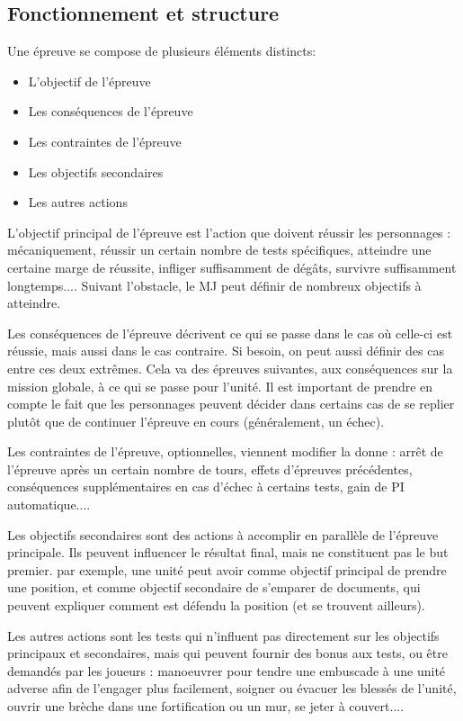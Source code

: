\documentclass[twocolumn]{report}
\begin{document}
\subsection{Fonctionnement et structure}
Une épreuve se compose de plusieurs éléments distincts:
\begin{itemize}
    \item L'objectif de l'épreuve
    \item Les conséquences de l'épreuve
    \item Les contraintes de l'épreuve
    \item Les objectifs secondaires
    \item Les autres actions
\end{itemize}
L'objectif principal de l'épreuve est l'action que doivent réussir les personnages : mécaniquement, réussir un certain nombre de tests spécifiques, atteindre une certaine marge de réussite, infliger suffisamment de dégâts, survivre suffisamment longtemps.... Suivant l'obstacle, le MJ peut définir de nombreux objectifs à atteindre.

Les conséquences de l'épreuve décrivent ce qui se passe dans le cas où celle-ci est réussie, mais aussi dans le cas contraire. Si besoin, on peut aussi définir des cas entre ces deux extrêmes. Cela va des épreuves suivantes, aux conséquences sur la mission globale, à ce qui se passe pour l'unité. Il est important de prendre en compte le fait que les personnages peuvent décider dans certains cas de se replier plutôt que de continuer l'épreuve en cours (généralement, un échec).

Les contraintes de l'épreuve, optionnelles, viennent modifier la donne : arrêt de l'épreuve après un certain nombre de tours, effets d'épreuves précédentes, conséquences supplémentaires en cas d'échec à certains tests, gain de PI automatique....

Les objectifs secondaires sont des actions à accomplir en parallèle de l'épreuve principale. Ils peuvent influencer le résultat final, mais ne constituent pas le but premier. par exemple, une unité peut avoir comme objectif principal de prendre une position, et comme objectif secondaire de s'emparer de documents, qui peuvent expliquer comment est défendu la position (et se trouvent ailleurs).

Les autres actions sont les tests qui n'influent pas directement sur les objectifs principaux et secondaires, mais qui peuvent fournir des bonus aux tests, ou être demandés par les joueurs : manoeuvrer pour tendre une embuscade à une unité adverse afin de l'engager plus facilement, soigner ou évacuer les blessés de l'unité, ouvrir une brèche dans une fortification ou un mur, se jeter à couvert.... 
\end{document}
